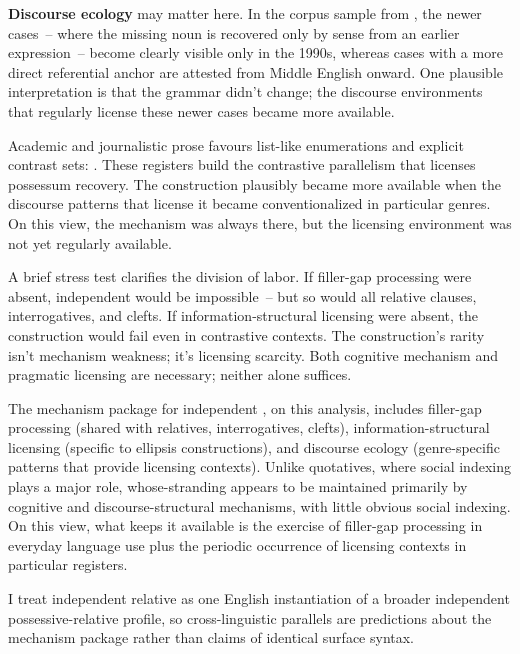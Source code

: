\textbf{Discourse ecology} may matter here. In the corpus sample from \textcite{reynolds2024whose}, the newer cases~-- where the missing noun is recovered only by sense from an earlier expression~-- become clearly visible only in the 1990s, whereas cases with a more direct referential anchor are attested from Middle English onward. One plausible interpretation is that the grammar didn't change; the discourse environments that regularly license these newer cases became more available.

Academic and journalistic prose favours list-like enumerations and explicit contrast sets: . These registers build the contrastive parallelism that licenses possessum recovery. The construction plausibly became more available when the discourse patterns that license it became conventionalized in particular genres. On this view, the mechanism was always there, but the licensing environment was not yet regularly available.

A brief stress test clarifies the division of labor. If filler-gap processing were absent, independent  would be impossible~-- but so would all relative clauses, interrogatives, and clefts. If information-structural licensing were absent, the construction would fail even in contrastive contexts. The construction's rarity isn't mechanism weakness; it's licensing scarcity. Both cognitive mechanism and pragmatic licensing are necessary; neither alone suffices.

The mechanism package for independent , on this analysis, includes filler-gap processing (shared with relatives, interrogatives, clefts), information-structural licensing (specific to ellipsis constructions), and discourse ecology (genre-specific patterns that provide licensing contexts). Unlike quotatives, where social indexing plays a major role, whose-stranding appears to be maintained primarily by cognitive and discourse-structural mechanisms, with little obvious social indexing. On this view, what keeps it available is the exercise of filler-gap processing in everyday language use plus the periodic occurrence of licensing contexts in particular registers.

I treat independent relative  as one English instantiation of a broader independent possessive-relative profile, so cross-linguistic parallels are predictions about the mechanism package rather than claims of identical surface syntax.

